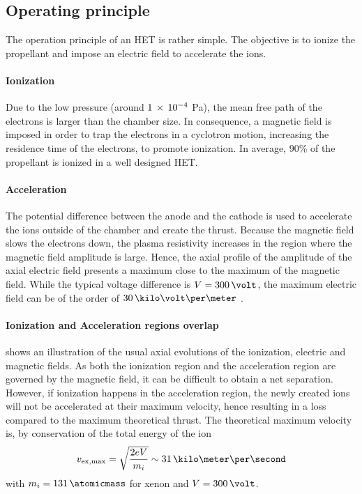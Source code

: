 \subsection{Operating principle}

The operation principle of an \ac{HET} is rather simple.
The objective is to ionize the propellant and impose an electric field to accelerate the ions.

\paragraph{Ionization\\}
Due to the low pressure (around ${1}\,\times\,10^{-4}$ Pa), the mean free path of the electrons is larger than the chamber size.
In consequence, a magnetic field is imposed in order to trap the electrons in a cyclotron motion, increasing the residence time of the electrons, to promote  ionization.
In average, 90\% of the propellant is ionized in a well designed \ac{HET}.

\paragraph{Acceleration\\}
The potential difference  between the anode and the cathode is used to accelerate the ions outside of the chamber and create the thrust.
Because the magnetic field slows the electrons down, the plasma resistivity increases in the region where the magnetic field amplitude is large.
Hence, the axial profile of the amplitude of the axial electric field presents a maximum close to the maximum of the magnetic field.
While the typical voltage difference is $V=300\,\volt$, the maximum electric field can be of the order of $30\,\kilo\volt\per\meter$ \citep{gawron2008}.

\paragraph{Ionization and Acceleration regions overlap\\}
 shows an illustration of the usual axial evolutions of the ionization, electric and magnetic fields.
As both the ionization region and the acceleration region are governed by the magnetic field, it can be difficult to obtain a net separation.
However, if ionization happens in the acceleration region, the newly created ions will not be accelerated at their maximum velocity, hence resulting in a loss compared to the maximum theoretical thrust.
The theoretical maximum velocity is, by conservation of the total energy of the ion
\begin{equation} \label{eq-vmaxtheo}
  v_{\rm ex, max} = \sqrt{ \frac{2 e V}{m_i} } \sim 31 \,\kilo\meter\per\second
\end{equation}
with $m_i = 131 \,\atomicmass$ for xenon and $V=300\,\volt$.


